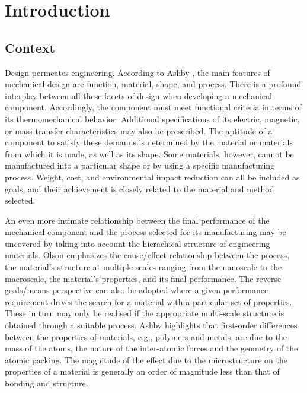\chapter{Introduction}

\section{Context}

Design permeates engineering.
According to Ashby \citep{ashbyMaterialsSelectionMechanical1999}, the main features of mechanical design are function, material, shape, and process.
There is a profound interplay between all these facets of design when developing a mechanical component.
Accordingly, the component must meet functional criteria in terms of its thermomechanical behavior.
Additional specifications of its electric, magnetic, or mass transfer characteristics may also be prescribed.
The aptitude of a component to satisfy these demands is determined by the material or materials from which it is made, as well as its shape.
Some materials, however, cannot be manufactured into a particular shape or by using a specific manufacturing process.
Weight, cost, and environmental impact reduction can all be included as goals, and their achievement is closely related to the material and method selected.

An even more intimate relationship between the final performance of the mechanical component and the process selected for its manufacturing may be uncovered by taking into account the hierachical structure of engineering materials.
Olson \citep{olsonDesigningNewMaterial2000} emphasizes the cause/effect relationship between the process, the material's structure at multiple scales ranging from the nanoscale to the macroscale, the material's properties, and its final performance.
The reverse goals/means perspective can also be adopted where a given performance requirement drives the search for a material with a particular set of properties.
These in turn may only be realised if the appropriate multi-scale structure is obtained through a suitable process.
Ashby \citep{ashbyMaterialsSelectionMechanical1999} highlights that first-order differences between the properties of materials, e.g., polymers and metals, are due to the mass of the atoms, the nature of the inter-atomic forces and the geometry of the atomic packing.
The magnitude of the effect due to the microstructure on the properties of a material is generally an order of magnitude less than that of bonding and structure.

